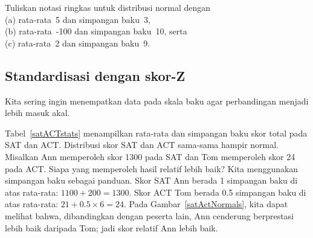 \begin{exercisewrap}
\begin{nexercise}
Tuliskan notasi ringkas untuk distribusi normal
dengan\footnotemark{} \\
(a)
    rata-rata~5 dan simpangan baku~3, \\
(b)
    rata-rata~-100 dan simpangan baku~10, serta \\
(c)
    rata-rata~2 dan simpangan baku~9.
\end{nexercise}
\end{exercisewrap}


\subsection{Standardisasi dengan skor-Z}

\noindent%
Kita sering ingin menempatkan data pada skala baku agar
perbandingan menjadi lebih masuk akal.

\newcommand{\satmean}{1100}
\newcommand{\satsd}{200}
\newcommand{\actmean}{21}
\newcommand{\actsd}{6}
\newcommand{\annsatscore}{1300}
\newcommand{\annsatzscore}{1}
\newcommand{\tomsatscore}{24}
\newcommand{\tomsatzscore}{0.5}

\begin{examplewrap}
\begin{nexample}{Tabel~\vref{satACTstats} menampilkan rata-rata
    dan simpangan baku skor total pada SAT dan ACT.
    Distribusi skor SAT dan ACT sama-sama hampir normal.
    Misalkan Ann memperoleh skor \annsatscore{} pada SAT dan Tom
    memperoleh skor \tomsatscore{} pada ACT.
    Siapa yang memperoleh hasil relatif lebih baik?}
  \label{actSAT}%
  Kita menggunakan simpangan baku sebagai panduan.
  Skor SAT Ann berada \annsatzscore{} simpangan baku di atas rata-rata:
  $\satmean{} + \satsd{} = \annsatscore{}$.
  Skor ACT Tom berada \tomsatzscore{} simpangan baku di atas rata-rata:
  $\actmean{} + \tomsatzscore{} \times \actsd{} = \tomsatscore{}$.
  Pada Gambar~\ref{satActNormals}, kita dapat melihat bahwa,
  dibandingkan dengan peserta lain, Ann cenderung berprestasi lebih baik
  daripada Tom; jadi skor relatif Ann lebih baik.
\end{nexample}
\end{examplewrap}

